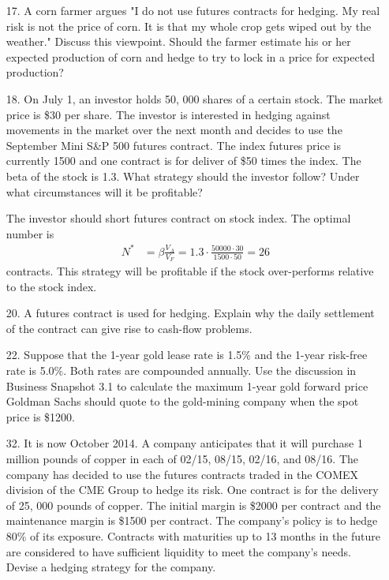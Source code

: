 \documentclass{article}
\begin{document}
\begin{itemize}
	\item[17.] A corn farmer argues "I do not use futures contracts for hedging. My real risk is not the price of corn. It is that my whole crop gets wiped out by the weather." Discuss this viewpoint. Should the farmer estimate his or her expected production of corn and hedge to try to lock in a price for expected production?

	\item[18.] On July 1, an investor holds 50, 000 shares of a certain stock. The market price is \$30 per share. The investor is interested in hedging against movements in the market over the next month and decides to use the September Mini S\&P 500 futures contract. The index futures price is currently 1500 and one contract is for deliver of \$50 times the index. The beta of the stock is 1.3. What strategy should the investor follow? Under what circumstances will it be profitable?
		\begin{soln}
			The investor should short futures contract on stock index. The optimal number is
			\begin{align*}
				N^* &= \beta\frac{V_A}{V_F} = 1.3\cdot \frac{50000\cdot 30}{1500\cdot50} = 26
			\end{align*}
			contracts. This strategy will be profitable if the stock over-performs relative to the stock index. 
		\end{soln}

	\item[20.] A futures contract is used for hedging. Explain why the daily settlement of the contract can give rise to cash-flow problems.

	\item[22.] Suppose that the 1-year gold lease rate is 1.5\% and the 1-year risk-free rate is 5.0\%. Both rates are compounded annually. Use the discussion in Business Snapshot 3.1 to calculate the maximum 1-year gold forward price Goldman Sachs should quote to the gold-mining company when the spot price is \$1200.

	\item[32.] It is now October 2014. A company anticipates that it will purchase 1 million pounds of copper in each of 02/15, 08/15, 02/16, and 08/16. The company has decided to use the futures contracts traded in the COMEX division of the CME Group to hedge its risk. One contract is for the delivery of 25, 000 pounds of copper. The initial margin is \$2000 per contract and the maintenance margin is \$1500 per contract. The company's policy is to hedge 80\% of its exposure. Contracts with maturities up to 13 months in the future are considered to have sufficient liquidity to meet the company's needs. Devise a hedging strategy for the company. 


\end{itemize}
\end{document}
